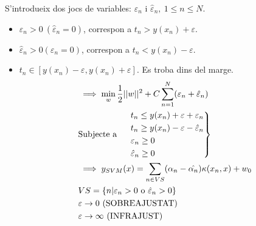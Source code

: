 \begin{figure}[H]
	\centering
\end{figure}

S'introdueix dos jocs de variables: $\varepsilon_n$ i $\hat{\varepsilon}_n, \ 1 \le n \le N$.

\begin{itemize}
	\item $\varepsilon_n > 0 \ (\hat{\varepsilon}_n = 0)$, correspon a $t_n > y(x_n) + \varepsilon$. 
	\item $\hat{\varepsilon}_n > 0 (\varepsilon_n = 0)$, correspon a $t_n < y(x_n) - \varepsilon$.
	\item $t_n \in [ y(x_n) - \varepsilon, y(x_n) + \varepsilon]$. Es troba dins del marge.
	\begin{align*}
		& \implies \min_w \frac{1}{2}||w||^2 + C \sum_{n=1}^N (\varepsilon_n + \hat{\varepsilon}_n) \\
		& \text{Subjecte a } 
		\begin{rcases}
			& t_n \le y (x_n) + \varepsilon + \varepsilon_n \\
			& t_n \ge y(x_n) - \varepsilon - \hat{\varepsilon}_n \\
			& \varepsilon_n \ge 0 \\
			& \hat{\varepsilon}_n \ge 0
		\end{rcases} \\
		& \implies y_{SVM}(x) = \sum_{n \in VS} (\alpha_n - \hat{\alpha_n})\kappa(x_n, x) + w_0 \\
		& VS = \{ n | \varepsilon_n > 0 \text{ o } \hat{\varepsilon}_n > 0 \} \\
		& \varepsilon \to 0 \ \text{(SOBREAJUSTAT)} \\
		& \varepsilon \to \infty \ \text{(INFRAJUST)}
	\end{align*}
\end{itemize}
